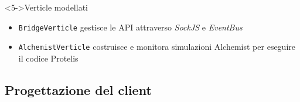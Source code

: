 \begin{frame}{\insertsectionhead}
      \begin{block}<5->{Verticle modellati}
        \begin{itemize}
          \item \texttt{BridgeVerticle} gestisce le API attraverso \emph{SockJS} e \emph{EventBus}
          \item \texttt{AlchemistVerticle} costruisce e monitora simulazioni Alchemist per eseguire il codice Protelis
        \end{itemize}
      \end{block}
    \end{frame}

    \subsection{Progettazione del client}




